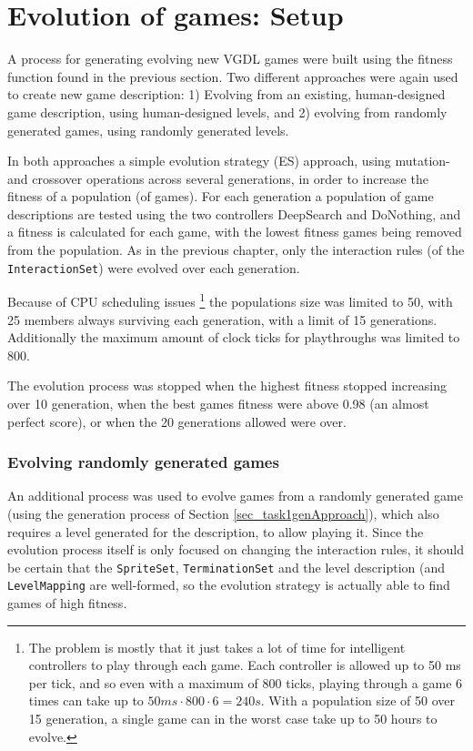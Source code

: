 \documentclass[a4paper,titlepage,final]{report}
\begin{document}

\section{Evolution of games: Setup}
\label{sec_task2evolvingGames}
A process for generating evolving new VGDL games were built using the fitness function found in the previous section.
Two different approaches were again used to create new game description:
1) Evolving from an existing, human-designed game description, using human-designed levels, and 2) evolving from randomly generated games, using randomly generated levels.

In both approaches a simple evolution strategy (ES) approach, using mutation- and crossover operations across several generations, in order to increase the fitness of a population (of games).
For each generation a population of game descriptions are tested using the two controllers DeepSearch and DoNothing, and a fitness is calculated for each game, with the lowest fitness games being removed from the population.
As in the previous chapter, only the interaction rules (of the \texttt{InteractionSet}) were evolved over each generation.

Because of CPU scheduling issues \footnote{The problem is mostly that it just takes a lot of time for intelligent controllers to play through each game. Each controller is allowed up to 50 ms per tick, and so even with a maximum of 800 ticks, playing through a game 6 times can take up to $50ms \cdot 800 \cdot  6 = 240s$. With a population size of 50 over 15 generation, a single game can in the worst case take up to 50 hours to evolve.} the populations size was limited to 50, with 25 members always surviving each generation, with a limit of 15 generations.
Additionally the maximum amount of clock ticks for playthroughs was limited to 800.

The evolution process was stopped when the highest fitness stopped increasing over 10 generation, when the best games fitness were above 0.98 (an almost perfect score), or when the 20 generations allowed were over.



\subsubsection*{Evolving randomly generated games}
An additional process was used to evolve games from a randomly generated game (using the generation process of Section \ref{sec_task1genApproach}), which also requires a level generated for the description, to allow playing it.
Since the evolution process itself is only focused on changing the interaction rules, it should be certain that the \texttt{SpriteSet}, \texttt{TerminationSet} and the level description (and \texttt{LevelMapping} are well-formed, so the evolution strategy is actually able to find games of high fitness.
\end{document}
